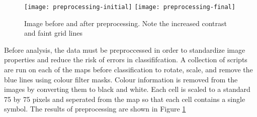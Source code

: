 \begin{figure}[h]
    \begin{center}
    \texttt{[image: preprocessing-initial]}
    \texttt{[image: preprocessing-final]}
    \label{figure:preprocess}
    \caption{Image before and after preprocessing. Note the increased contrast and faint grid lines}
    \end{center}
\end{figure}

Before analysis, the data must be preproccessed in order to standardize image
properties and reduce the risk of errors in classififcation. A collection of
scripts are run on each of the maps before classification to rotate, scale,
and remove the blue lines using colour filter masks.  Colour information is
removed from the images by converting them to black and white. Each cell is
scaled to a standard 75 by 75 pixels and seperated from the map so that each
cell contains a single symbol.  The results of preprocessing are shown in
Figure \ref{figure:preprocess}

